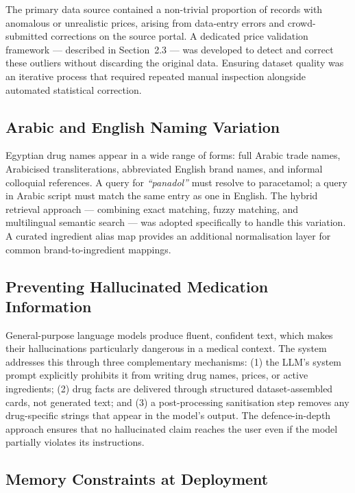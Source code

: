 \documentclass[12pt,a4paper]{article}
\begin{document}
The primary data source contained a non-trivial proportion of records with
anomalous or unrealistic prices, arising from data-entry errors and
crowd-submitted corrections on the source portal. A dedicated price
validation framework --- described in Section~2.3 --- was developed to
detect and correct these outliers without discarding the original data.
Ensuring dataset quality was an iterative process that required repeated
manual inspection alongside automated statistical correction.

\subsection{Arabic and English Naming Variation}

Egyptian drug names appear in a wide range of forms: full Arabic trade
names, Arabicised transliterations, abbreviated English brand names, and
informal colloquial references. A query for \textit{``panadol''} must
resolve to paracetamol; a query in Arabic script must match the same entry
as one in English. The hybrid retrieval approach --- combining exact
matching, fuzzy matching, and multilingual semantic search --- was adopted
specifically to handle this variation. A curated ingredient alias map
provides an additional normalisation layer for common brand-to-ingredient
mappings.

\subsection{Preventing Hallucinated Medication Information}

General-purpose language models produce fluent, confident text, which makes
their hallucinations particularly dangerous in a medical context. The system
addresses this through three complementary mechanisms: (1) the LLM's system
prompt explicitly prohibits it from writing drug names, prices, or active
ingredients; (2) drug facts are delivered through structured dataset-assembled
cards, not generated text; and (3) a post-processing sanitisation step removes
any drug-specific strings that appear in the model's output. The defence-in-depth
approach ensures that no hallucinated claim reaches the user even if the model
partially violates its instructions.

\subsection{Memory Constraints at Deployment}
\end{document}
